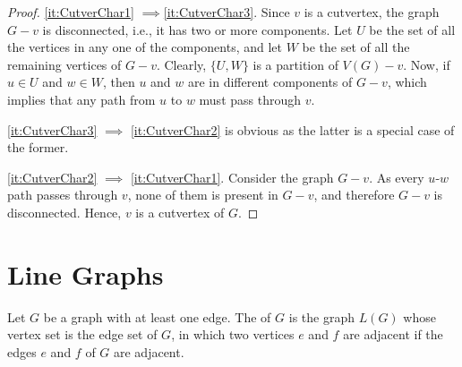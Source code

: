 \begin{proof}
\cref{it:CutverChar1} $\implies $\cref{it:CutverChar3}. Since $v$ is a cutvertex, the graph $G - v$ is disconnected, i.e., it has two or more components. Let $U$ be the set of all the vertices in any one of the components, and let $W$ be the set of all the remaining vertices of $G - v$. Clearly, $\{U, W\}$ is a partition of $V(G) - v$. Now, if $u \in U$ and $w \in W$, then $u$ and $w$ are in different components of $G - v$, which implies that any path from $u$ to $w$ must pass through $v$.

\noindent \cref{it:CutverChar3} $\implies$ \cref{it:CutverChar2} is obvious as the latter is a special case of the former.

\noindent \cref{it:CutverChar2} $\implies$ \cref{it:CutverChar1}. Consider the graph $G - v$. As every $u$-$w$ path passes through $v$, none of them is present in $G - v$, and therefore $G - v$ is disconnected. Hence, $v$ is a cutvertex of $G$.
\end{proof}

\section{Line Graphs}\label{sec:LineGraphs}

Let $G$ be a graph with at least one edge. The  of $G$ is the graph $L(G)$ whose vertex set is the edge set of $G$, in which two vertices $e$ and $f$ are adjacent if the edges $e$ and $f$ of $G$ are adjacent.

